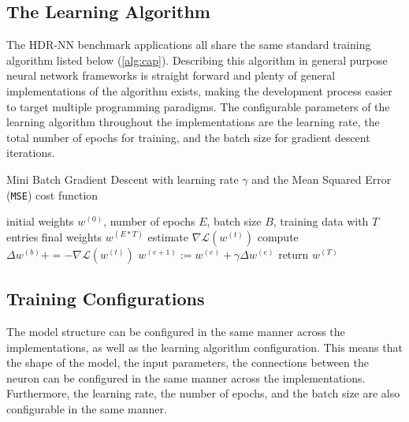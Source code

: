 \subsection{The Learning Algorithm}

The HDR-NN benchmark applications all share the same standard training algorithm listed below (\ref{alg:cap}). Describing this algorithm in general purpose neural network frameworks is straight forward and plenty of general implementations of the algorithm exists, making the development process easier to target multiple programming paradigms. The configurable parameters of the learning algorithm throughout the implementations are the learning rate, the total number of epochs for training, and the batch size for gradient descent iterations.

\begin{algorithm}[h]
	\caption{Mini Batch Gradient Descent with learning rate $\gamma$ and the Mean Squared Error (\texttt{MSE}) cost function}
	\label{alg:cap}
	\begin{algorithmic}
	\Require initial weights $w^{(0)}$, number of epochs $E$, batch size $B$, training data with $T$ entries
	\Ensure final weights $w^{(E*T)}$
			\State estimate $\nabla \mathcal{L}(w^{(t)})$ 
			\State compute $\Delta w^{(b)} += - \nabla \mathcal{L}(w^{(t)})$\label{lin:deep-learning-delta-w}
			\EndFor
			\State $w^{(e + 1)} := w^{(e)} + \gamma \Delta w^{(e)}$
		\EndFor
	\EndFor
	\State return $w^{(T)}$
	\end{algorithmic}
\end{algorithm}


\subsection{Training Configurations}

The model structure can be configured in the same manner across the implementations, as well as the learning algorithm configuration. This means that the shape of the model, the input parameters, the connections between the neuron can be configured in the same manner across the implementations. Furthermore, the learning rate, the number of epochs, and the batch size are also configurable in the same manner.

